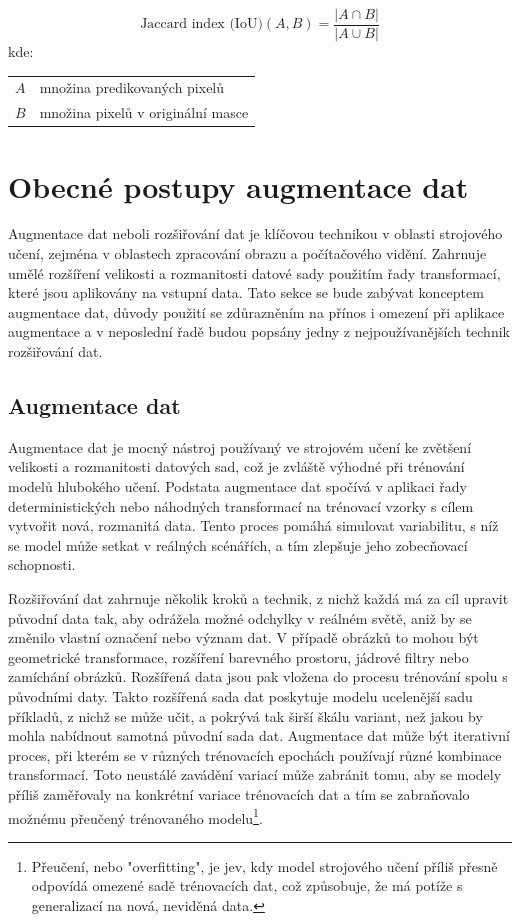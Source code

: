 \documentclass[male,czech,api_ing]{thesis}
\makeatletter
\newenvironment{conditions}[1][kde:]
    {#1 \begin{tabular}[t]{>{$}l<{$} @{${}={}$} >{\raggedright\arraybackslash}p{10cm}}}
    {\end{tabular}}
\makeatother
\begin{document}
\begin{equation}
    \text{Jaccard index (IoU)}(A, B) = \frac{|A \cap B|}{|A \cup B|}
\end{equation}
\begin{conditions}
    A & množina predikovaných pixelů \\
    B & množina pixelů v originální masce \\
\end{conditions}

\section{Obecné postupy augmentace dat}
Augmentace dat neboli rozšiřování dat je klíčovou technikou v oblasti strojového učení, zejména v oblastech zpracování obrazu a počítačového vidění. Zahrnuje umělé rozšíření velikosti a rozmanitosti datové sady použitím řady transformací, které jsou aplikovány na vstupní data. Tato sekce se bude zabývat konceptem augmentace dat, důvody použití se zdůrazněním na přínos i omezení při aplikace augmentace a v neposlední řadě budou popsány jedny z nejpoužívanějších technik rozšiřování dat.

\subsection{Augmentace dat}
Augmentace dat je mocný nástroj používaný ve strojovém učení ke zvětšení velikosti a rozmanitosti datových sad, což je zvláště výhodné při trénování modelů hlubokého učení. Podstata augmentace dat spočívá v aplikaci řady deterministických nebo náhodných transformací na trénovací vzorky s cílem vytvořit nová, rozmanitá data. Tento proces pomáhá simulovat variabilitu, s níž se model může setkat v reálných scénářích, a tím zlepšuje jeho zobecňovací schopnosti.

Rozšiřování dat zahrnuje několik kroků a technik, z nichž každá má za cíl upravit původní data tak, aby odrážela možné odchylky v reálném světě, aniž by se změnilo vlastní označení nebo význam dat. V případě obrázků to mohou být geometrické transformace, rozšíření barevného prostoru, jádrové filtry nebo zamíchání obrázků. Rozšířená data jsou pak vložena do procesu trénování spolu s původními daty. Takto rozšířená sada dat poskytuje modelu ucelenější sadu příkladů, z nichž se může učit, a pokrývá tak širší škálu variant, než jakou by mohla nabídnout samotná původní sada dat. Augmentace dat může být iterativní proces, při kterém se v různých trénovacích epochách používají různé kombinace transformací. Toto neustálé zavádění variací může zabránit tomu, aby se modely příliš zaměřovaly na konkrétní variace trénovacích dat a tím se zabraňovalo možnému přeučený trénovaného modelu\footnote{Přeučení, nebo "overfitting", je jev, kdy model strojového učení příliš přesně odpovídá omezené sadě trénovacích dat, což způsobuje, že má potíže s generalizací na nová, neviděná data.}. \cite{AugmentationBasics, AugmentationSurvey}
\end{document}
